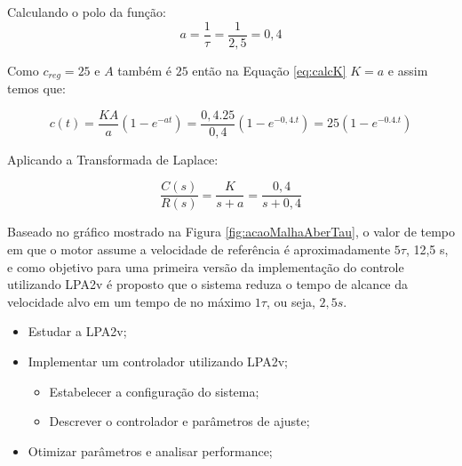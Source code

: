 Calculando o polo da função:
\begin{equation}
  a = \frac{1}{\tau} = \frac{1}{2,5} = 0,4
\end{equation}

Como $c_{reg} = 25$ e $A$ também é $25$ então na Equação \ref{eq:calcK} $K = a$ e assim temos que:

\begin{equation}
c(t) = \frac{KA}{a}(1-e^{-at}) = \frac{0,4.25}{0,4}(1-e^{-0,4.t}) = 25(1-e^{-0.4.t})
\end{equation}


Aplicando a Transformada de Laplace:

\begin{equation}
  \frac{C(s)}{R(s)} = \frac{K}{s+a} = \frac{0,4}{s+0,4}
\end{equation}



Baseado no gráfico mostrado na Figura \ref{fig:acaoMalhaAberTau}, o valor de tempo em que o motor assume a velocidade de referência é aproximadamente $5\tau$, 12,5 s, e como objetivo para uma primeira versão da implementação do controle utilizando LPA2v é proposto que o sistema reduza o tempo de alcance da velocidade alvo em um tempo de no máximo $1\tau$, ou seja, $2,5 s$.










\begin{itemize}
\item Estudar a LPA2v;
\item Implementar um controlador utilizando LPA2v;
	\begin{itemize}
	\item Estabelecer a configuração do sistema;
	\item Descrever o controlador e parâmetros de ajuste;
	\end{itemize}
\item Otimizar parâmetros e analisar performance;
\end{itemize}



